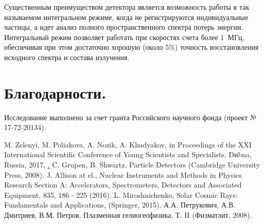 \documentclass[12pt, a4paper, notitlepage, onecolumn]{article}
\begin{document}
Существенным преимуществом детектора является возможность работы в так называемом интегральном режиме, когда не регистрируются индивидуальные частицы, а идет анализ полного пространственного спектра потерь энергии. Интегральный режим позволяет работать при скоростях счета более 1~МГц, обеспечивая при этом достаточно хорошую (около 5\%) точность восстановления исходного спектра и состава излучения.

\section*{Благодарности.}
Исследование выполнено за счет гранта Российского научного фонда (проект № 17-72-20134).


\begin{thebibliography}{5}
      M. Zelenyi, M. Poliakova, A. Nozik, A. Khudyakov,  in Proceedings of the XXI International Scientific Conference of Young Scientists and Specialists, Dиbna, Russia, 2017,  \href{https://doi.org/10.1051/epjconf/201817707005}.
     C. Grupen, B. Shwartz, Particle Detectors (Cambridge University Press, 2008).
     J. Allison at el., Nuclear Instruments and Methods in Physics Research Section A: Accelerators, Spectrometers, Detectors and Associated Equipment, 835, 186 - 225 (2016).  
     L. Miroshnichenko, Solar Cosmic Rays: Fundamentals and Applications, (Springer, 2015).
     А.А. Петрукович, А.В. Дмитриев, В.М. Петров, Плазменная гелиогеофизика, Т. II (Физматлит, 2008).
\end{thebibliography}

\end{document}
